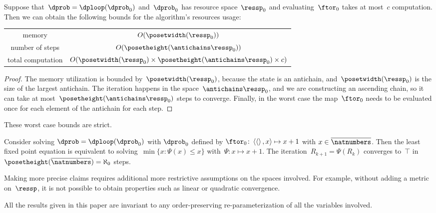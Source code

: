 \begin{proposition}
    \label{prop:complexity}
    Suppose that~$\dprob=\dploop(\dprob_{0})$ and~$\dprob_{0}$ has resource space~$\ressp_{0}$ and evaluating~$\ftor_{0}$ takes at most~$c$ computation. Then we can obtain the following bounds for the algorithm's resources usage:

    \smallskip{}
    \begin{tabular}{cc}
        memory & $O(\posetwidth(\ressp_{0}))$\tabularnewline
        number of steps & $O(\posetheight(\antichains\ressp_{0}))$\tabularnewline
        total computation & $O(\posetwidth(\ressp_{0})\times\posetheight(\antichains\ressp_{0})\times c)$\tabularnewline
    \end{tabular}

\end{proposition}
\begin{proof}
    The memory utilization is bounded by~$\posetwidth(\ressp_{0})$, because the state is an antichain, and~$\posetwidth(\ressp_{0})$ is the size of the largest antichain. The iteration happens in the space~$\antichains\ressp_{0}$, and we are constructing an ascending chain, so it can take at most~$\posetheight(\antichains\ressp_{0})$ steps to converge. Finally, in the worst case the map~$\ftor_{0}$ needs to be evaluated once for each element of the antichain for each step.
\end{proof}
These worst case bounds are strict.
\begin{example}
    Consider solving $\dprob=\dploop(\dprob_{0})$ with $\dprob_{0}$
    defined by $\ftor_{0}\colon\left\langle \left\langle \right\rangle ,x\right\rangle \mapsto x+1$
    with $x\in\overline{\natnumbers}$. Then the least fixed point equation
    is equivalent to solving~$\min\{x\colon\Psi(x)\leq x\}$ with~$\Psi:x\mapsto x+1$.
    The iteration~$R_{k+1}=\Psi(R_{k})$ converges to~$\top$ in~$\posetheight(\overline{\natnumbers})=\aleph_{0}$
    steps.
\end{example}

\begin{remark}
    Making more precise claims requires additional more restrictive assumptions
    on the spaces involved. For example, without adding a metric on~$\ressp$,
    it is not possible to obtain properties such as linear or quadratic
    convergence.
\end{remark}

\begin{remark}
    All the results given in this paper are invariant to any order-preserving
    re-parameterization of all the variables involved.
\end{remark}

